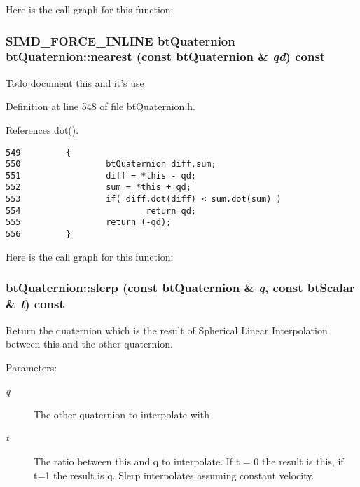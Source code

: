 Here is the call graph for this function:\hypertarget{classbt_quaternion_821a38604c6333b95d954867315d8716}{
\subsubsection[nearest]{\setlength{\rightskip}{0pt plus 5cm}SIMD\_\-FORCE\_\-INLINE {\bf btQuaternion} btQuaternion::nearest (const {\bf btQuaternion} \& {\em qd}) const}}
\label{classbt_quaternion_821a38604c6333b95d954867315d8716}


\begin{Desc}
\item[\hyperlink{todo__todo000043}{Todo}]document this and it's use \end{Desc}


Definition at line 548 of file btQuaternion.h.

References dot().

\begin{Code}\begin{verbatim}549         {
550                 btQuaternion diff,sum;
551                 diff = *this - qd;
552                 sum = *this + qd;
553                 if( diff.dot(diff) < sum.dot(sum) )
554                         return qd;
555                 return (-qd);
556         }
\end{verbatim}
\end{Code}




Here is the call graph for this function:\hypertarget{classbt_quaternion_c95a27feda1c165b2ce359e7415fec6f}{
\subsubsection[slerp]{ btQuaternion::slerp (const {\bf btQuaternion} \& {\em q}, \/  const btScalar \& {\em t}) const}}
\label{classbt_quaternion_c95a27feda1c165b2ce359e7415fec6f}


Return the quaternion which is the result of Spherical Linear Interpolation between this and the other quaternion. 

\begin{Desc}
\item[Parameters:]
\begin{description}
\item[{\em q}]The other quaternion to interpolate with \item[{\em t}]The ratio between this and q to interpolate. If t = 0 the result is this, if t=1 the result is q. Slerp interpolates assuming constant velocity. \end{description}
\end{Desc}


